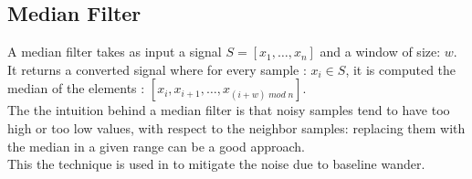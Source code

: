 \documentclass[LaM,binding=0.6cm]{sapthesis}
\begin{document}
\subsection{Median Filter}
A median filter takes as input a signal $S = [x_1, \dots, x_n]$ and a window of size: $w$.\\It returns a converted signal where for every sample : $x_i \in S$, it is computed the median of the elements : $[x_i, x_{i+1}, \dots , x_{(i+w) \; mod \; n}]$.\\The the intuition behind a median filter is that noisy samples tend to have too high or too low values, with respect to the neighbor samples: replacing them with the median in a given range can be a good approach.\\This the technique is used in \cite{rfdwt} to mitigate the noise due to baseline wander.
\end{document}
